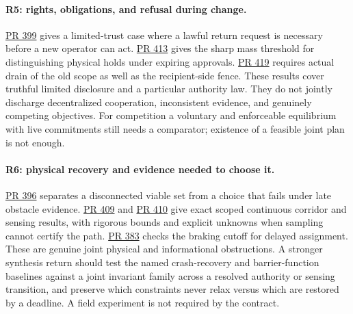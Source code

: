 \documentclass[11pt]{article}
\newcommand{\pr}[1]{\href{https://github.com/eternal-november/eos-research-programmes/pull/#1}{PR #1}}
\begin{document}
\paragraph{R5: rights, obligations, and refusal during change.}
\pr{399} gives a limited-trust case where a lawful return request is necessary before a new operator can act. \pr{413} gives the sharp mass threshold for distinguishing physical holds under expiring approvals. \pr{419} requires actual drain of the old scope as well as the recipient-side fence. These results cover truthful limited disclosure and a particular authority law. They do not jointly discharge decentralized cooperation, inconsistent evidence, and genuinely competing objectives. For competition a voluntary and enforceable equilibrium with live commitments still needs a comparator; existence of a feasible joint plan is not enough.

\paragraph{R6: physical recovery and evidence needed to choose it.}
\pr{396} separates a disconnected viable set from a choice that fails under late obstacle evidence. \pr{409} and \pr{410} give exact scoped continuous corridor and sensing results, with rigorous bounds and explicit unknowns when sampling cannot certify the path. \pr{383} checks the braking cutoff for delayed assignment. These are genuine joint physical and informational obstructions. A stronger synthesis return should test the named crash-recovery and barrier-function baselines against a joint invariant family across a resolved authority or sensing transition, and preserve which constraints never relax versus which are restored by a deadline. A field experiment is not required by the contract.
\end{document}
